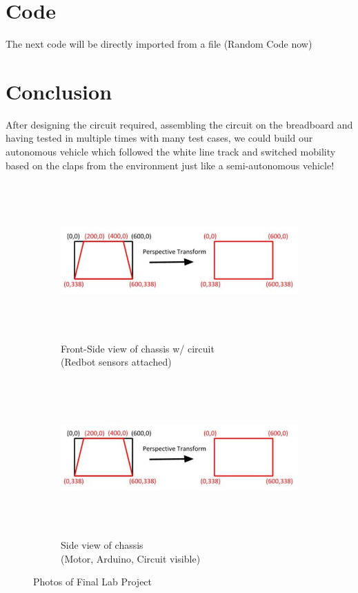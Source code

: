 \documentclass[12pt,a4paper]{article}
\begin{document}
\begin{large}
\section{Code}

The next code will be directly imported from a file (Random Code now)



\section{Conclusion}
After designing the circuit required, assembling the circuit on the breadboard and having tested in multiple times with many test cases, we could build our autonomous vehicle which followed the white line track and switched mobility based on the claps from the environment just like a semi-autonomous vehicle! \\
\begin{figure}[!hbp]
\centering
  \begin{subfigure}[b]{0.4\textwidth}
  \centering
  \captionsetup{justification=centering}
    \includegraphics[width=\textwidth, height = 6cm]{images/perspective_transform.jpg}
    \caption{Front-Side view of chassis w/ circuit\\ (Redbot sensors attached)}
    \label{fig:g1}
  \end{subfigure}
  \hspace{1cm}
  \begin{subfigure}[b]{0.4\textwidth}
  \centering
  \captionsetup{justification=centering}
    \includegraphics[width=\textwidth, height = 6cm]{images/perspective_transform.jpg}
    \caption{Side view of chassis \\(Motor, Arduino, Circuit visible)}
    \label{fig:g2}
  \end{subfigure}
  \caption{Photos of Final Lab Project}
\end{figure}


\end{large}
\end{document}
